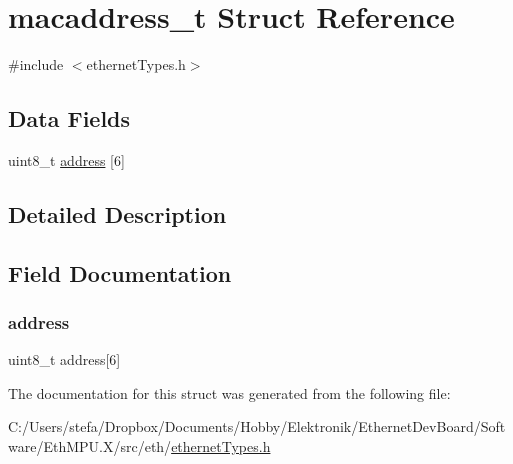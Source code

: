 \hypertarget{structmacaddress__t}{}\section{macaddress\+\_\+t Struct Reference}
\label{structmacaddress__t}


{\ttfamily \#include $<$ethernet\+Types.\+h$>$}

\subsection*{Data Fields}
\begin{DoxyCompactItemize}
\item 
uint8\+\_\+t \mbox{\hyperlink{structmacaddress__t_a3859a5a24fa98fcde6ab0e29800d2318}{address}} \mbox{[}6\mbox{]}
\end{DoxyCompactItemize}


\subsection{Detailed Description}


\subsection{Field Documentation}
\mbox{\label{structmacaddress__t_a3859a5a24fa98fcde6ab0e29800d2318}} 
\subsubsection{\texorpdfstring{address}{address}}
{\footnotesize\ttfamily uint8\+\_\+t address\mbox{[}6\mbox{]}}



The documentation for this struct was generated from the following file\+:\begin{DoxyCompactItemize}
\item 
C\+:/\+Users/stefa/\+Dropbox/\+Documents/\+Hobby/\+Elektronik/\+Ethernet\+Dev\+Board/\+Software/\+Eth\+M\+P\+U.\+X/src/eth/\mbox{\hyperlink{ethernet_types_8h}{ethernet\+Types.\+h}}\end{DoxyCompactItemize}
